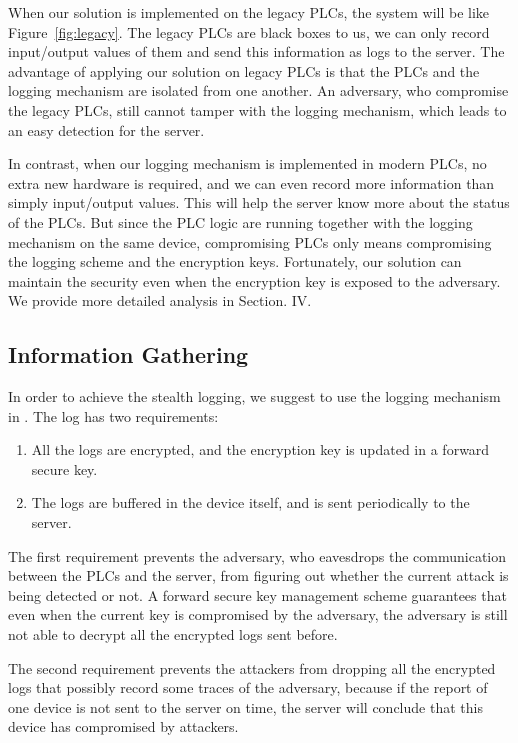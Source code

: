 When our solution is implemented on the legacy PLCs, the system will be like Figure~\ref{fig:legacy}. The legacy PLCs are black boxes to us, we can only record input/output values of them and send this information as logs to the server. The advantage of applying our solution on legacy PLCs is that the PLCs and the logging mechanism are isolated from one another. An adversary, who compromise the legacy PLCs, still cannot tamper with the logging mechanism, which leads to an easy detection for the server. 

In contrast, when our logging mechanism is implemented in modern PLCs, no extra new hardware is required, and we can even record more information than simply input/output values. This will help the server know more about the status of the PLCs. But since the PLC logic are running together with the logging mechanism on the same device, compromising PLCs only means compromising the logging scheme and the encryption keys. Fortunately, our solution can maintain the security even when the encryption key is exposed to the adversary. We provide more detailed analysis in Section. IV.   

\subsection{Information Gathering}

In order to achieve the stealth logging, we suggest to use the logging mechanism in \cite{IEEEhowto:kopka}. The log has two requirements:

\begin{enumerate}
\item All the logs are encrypted, and the encryption key is updated in a forward secure key. 
\item The logs are buffered in the device itself, and is sent periodically to the server.
\end{enumerate}

The first requirement prevents the adversary, who eavesdrops the communication between the PLCs and the server, from figuring out whether the current attack is being detected or not. A forward secure key management scheme guarantees that even when the current key is compromised by the adversary, the adversary is still not able to decrypt all the encrypted logs sent before. 

The second requirement prevents the attackers from dropping all the encrypted logs that possibly record some traces of the adversary, because if the report of one device is not sent to the server on time, the server will conclude that this device has compromised by attackers.

